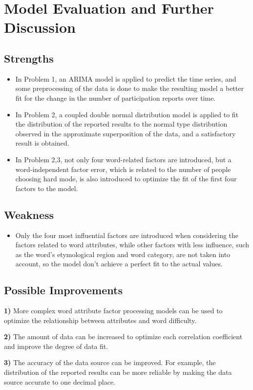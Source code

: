 \documentclass[12pt]{mcmthesis}
\begin{document}
\section{Model Evaluation and Further Discussion}
\subsection{Strengths}
\begin{itemize}
\item In Problem 1, an ARIMA model is applied to predict the time series, and some preprocessing of the data is done to make the resulting model a better fit for the change in the number of participation reports over time.
\item In Problem 2, a coupled double normal distribution model is applied to fit the distribution of the reported results to the normal type distribution observed in the approximate superposition of the data, and a satisfactory result is obtained.
\item In Problem 2,3, not only four word-related factors are introduced, but a word-independent factor error, which is related to the number of people choosing hard mode, is also introduced to optimize the fit of the first four factors to the model.
\end{itemize}
\subsection{Weakness}
\begin{itemize}
	\item Only the four most influential factors are introduced when considering the factors related to word attributes, while other factors with less influence, such as the word's etymological region and word category, are not taken into account, so the model don't achieve a perfect fit to the actual values.
\end{itemize}
\subsection{Possible Improvements}
\hspace{1.4em}\textbf{1)} More complex word attribute factor processing models can be used to optimize the relationship between attributes and word difficulty.

\textbf{2)} The amount of data can be increased to optimize each correlation coefficient and improve the degree of data fit.

\textbf{3)} The accuracy of the data source can be improved. For example, the distribution of the reported results can be more reliable by making the data source accurate to one decimal place.
\end{document}
